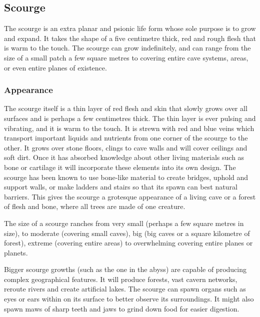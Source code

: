 \subsection{Scourge}
\label{sec:Scourge}

The scourge is an extra planar and psionic life form whose sole purpose is to
grow and expand. It takes the shape of a five centimetre thick, red and rough
flesh that is warm to the touch. The scourge can grow indefinitely, and can
range from the size of a small patch a few square metres to covering entire
cave systems, areas, or even entire planes of existence.

\subsubsection{Appearance}

The scourge itself is a thin layer of red flesh and skin that slowly grows
over all surfaces and is perhaps a few centimetres thick. The thin layer
is ever pulsing and vibrating, and it is warm to the touch. It is strewn with
red and blue veins which transport important liquids and nutrients from one
corner of the scourge to the other. It grows over stone floors, clings to cave
walls and will cover ceilings and soft dirt. Once it has absorbed knowledge
about other living materials such as bone or cartilage it will incorporate
these elements into its own design. The scourge has been known to use
bone-like material to create bridges, uphold and support walls, or make
ladders and stairs so that its spawn can best natural barriers. This gives
the scourge a grotesque appearance of a living cave or a forest of flesh and
bone, where all trees are made of one creature.

The size of a scourge ranches from very small (perhaps a few square metres in
size), to moderate (covering small caves), big (big caves or a square kilometre
of forest), extreme (covering entire areas) to overwhelming covering entire
planes or planets.

Bigger scourge growths (such as the one in the abyss) are capable of producing
complex geographical features. It will produce forests, vast cavern networks,
reroute rivers and create artificial lakes. The scourge can spawn organs such
as eyes or ears within on its surface to better observe its surroundings. It
might also spawn maws of sharp teeth and jaws to grind down food for easier
digestion.

